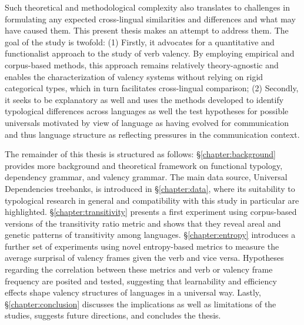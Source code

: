 Such theoretical and methodological complexity also translates to challenges in formulating any expected cross-lingual similarities and differences and what may have caused them. This present thesis makes an attempt to address them. The goal of the study is twofold: (1) Firstly, it advocates for a quantitative and functionalist approach to the study of verb valency. By employing empirical and corpus-based methods, this approach remains relatively theory-agnostic and enables the characterization of valency systems without relying on rigid categorical types, which in turn facilitates cross-lingual comparison; (2) Secondly, it seeks to be explanatory as well and uses the methods developed to identify typological differences across languages as well the test hypotheses for possible universals motivated by view of language as having evolved for communication and thus language structure as reflecting pressures in the communication context.

The remainder of this thesis is structured as follows: §\ref{chapter:background} provides more background and theoretical framework on functional typology, dependency grammar, and valency grammar. The main data source, Universal Dependencies treebanks, is introduced in §\ref{chapter:data}, where its suitability to typological research in general and compatibility with this study in particular are highlighted. §\ref{chapter:transitivity} presents a first experiment using corpus-based versions of the transitivity ratio metric and shows that they reveal areal and genetic patterns of transitivity among languages. §\ref{chapter:entropy} introduces a further set of experiments using novel entropy-based metrics to measure the average surprisal of valency frames given the verb and vice versa. Hypotheses regarding the correlation between these metrics and verb or valency frame frequency are posited and tested, suggesting that learnability and efficiency effects shape valency structures of languages in a universal way. Lastly, §\ref{chapter:conclusion} discusses the implications as well as limitations of the studies, suggests future directions, and concludes the thesis.
